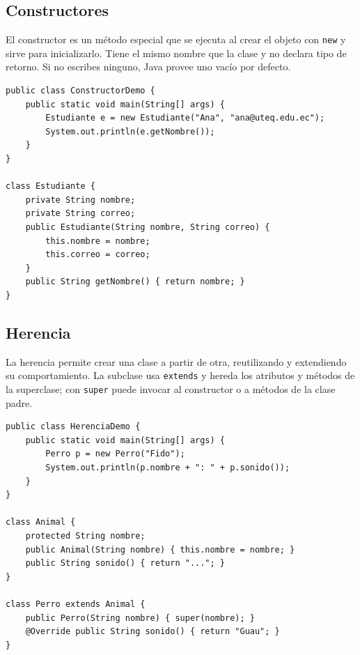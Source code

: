 \documentclass[11pt]{article}
\begin{document}
\subsection{Constructores}
El constructor es un método especial que se ejecuta al crear el objeto con \texttt{new} y sirve para inicializarlo. Tiene el mismo nombre que la clase y no declara tipo de retorno. Si no escribes ninguno, Java provee uno vacío por defecto.

\begin{cajacodigo}
\begin{lstlisting}[style=java]
public class ConstructorDemo {
    public static void main(String[] args) {
        Estudiante e = new Estudiante("Ana", "ana@uteq.edu.ec");
        System.out.println(e.getNombre());
    }
}

class Estudiante {
    private String nombre;
    private String correo;
    public Estudiante(String nombre, String correo) {
        this.nombre = nombre;
        this.correo = correo;
    }
    public String getNombre() { return nombre; }
}
\end{lstlisting}
\end{cajacodigo}
\vspace{2pt}
\subsection{Herencia}
La herencia permite crear una clase a partir de otra, reutilizando y extendiendo su comportamiento. La subclase usa \texttt{extends} y hereda los atributos y métodos de la superclase; con \texttt{super} puede invocar al constructor o a métodos de la clase padre.

\begin{cajacodigo}
\begin{lstlisting}[style=java]
public class HerenciaDemo {
    public static void main(String[] args) {
        Perro p = new Perro("Fido");
        System.out.println(p.nombre + ": " + p.sonido());
    }
}

class Animal {
    protected String nombre;
    public Animal(String nombre) { this.nombre = nombre; }
    public String sonido() { return "..."; }
}

class Perro extends Animal {
    public Perro(String nombre) { super(nombre); }
    @Override public String sonido() { return "Guau"; }
}
\end{lstlisting}
\end{cajacodigo}
\vspace{2pt}
\end{document}
